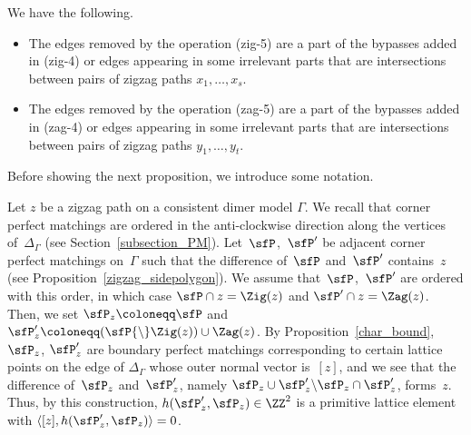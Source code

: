 \begin{Lemma}\label{bypass_removable}
We have the following.
\begin{itemize}\itemsep=0pt
\item[\rm (1)] The edges removed by the operation {\rm(zig-5)} are a part of the bypasses added in {\rm(zig-4)} or edges appearing in some irrelevant parts that are intersections between pairs of zigzag paths $x_1,\dots,x_s$.
\item[\rm (2)] The edges removed by the operation {\rm(zag-5)} are a part of the bypasses added in {\rm(zag-4)} or edges appearing in some irrelevant parts that are intersections between pairs of zigzag paths $y_1,\dots,y_t$.
\end{itemize}
\end{Lemma}

Before showing the next proposition, we introduce some notation.

\begin{setting}\label{setting_PMs_z}
Let $z$ be a zigzag path on a consistent dimer model $\Gamma$.
We recall that corner perfect matchings are ordered in the anti-clockwise direction along the vertices of~$\Delta_\Gamma$ (see Section~\ref{subsection_PM}).
Let~$\sfP$,~$\sfP^\prime$ be adjacent corner perfect matchings on~$\Gamma$ such that the difference of~$\sfP$ and~$\sfP^\prime$ contains~$z$ (see Proposition~\ref{zigzag_sidepolygon}).
We assume that~$\sfP$,~$\sfP^\prime$ are ordered with this order, in which case $\sfP\cap z=\Zig(z)$ and $\sfP^\prime\cap z=\Zag(z)$.
Then, we set $\sfP_z\coloneqq \sfP$ and $\sfP^\prime_z\coloneqq (\sfP{\setminus}\Zig(z))\cup\Zag(z)$.
By Proposition~\ref{char_bound}, $\sfP_z$, $\sfP^\prime_z$ are boundary perfect matchings corresponding to certain lattice points on the edge of $\Delta_\Gamma$ whose outer normal vector is~$[z]$,
and we see that the difference of~$\sfP_z$ and~$\sfP^\prime_z$, namely $\sfP_z\cup\sfP^\prime_z{\setminus}\sfP_z\cap\sfP^\prime_z$, forms~$z$.
Thus, by this construction, $h(\sfP^\prime_z,\sfP_z)\in\ZZ^2$ is a primitive lattice element with $\langle[z],h(\sfP^\prime_z,\sfP_z)\rangle=0$.
\end{setting}

